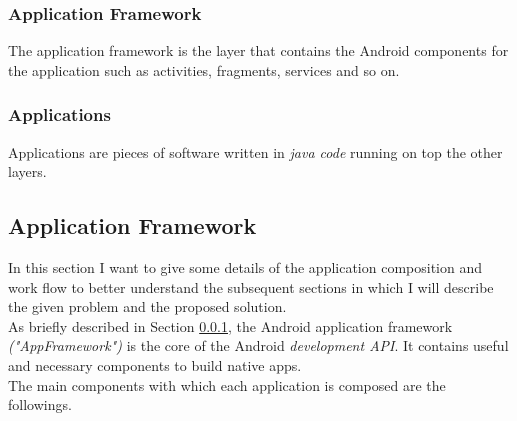 \subsubsection{Application Framework}\label{appframework}
The application framework is the layer that contains the Android components for the application such as activities, fragments, services and so on. 
\subsubsection{Applications}
Applications are pieces of software written in \textit{java code} running on top the other layers.

\subsection{Application Framework}
In this section I want to give some details of the application composition and work flow to better understand the subsequent sections in which I will describe the given problem and the proposed solution.\\
As briefly described in Section \ref{appframework}, the Android application framework \textit{("AppFramework")} is the core of the Android \textit{development API}. It contains useful and necessary components to build native apps.\\
The main components with which each application is composed are the followings.


